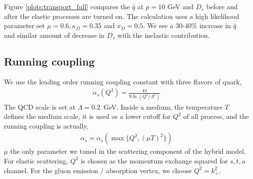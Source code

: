 \documentclass[aps, prc, reprint, amsmath, groupedaddress, nofootinbib]{revtex4-1}
\begin{document}
Figure \ref{plots:transport_full} compares the $\hat{q}$ at $p=10$ GeV and $D_s$ before and after the elastic processes are turned on.
The calculation uses a high likelihood parameter set $\mu = 0.6, \kappa_D = 0.35$ and $x_D = 0.5$. 
We see a 30-40\% increase in $\hat{q}$ and similar amount of decrease in $D_s$ with the inelastic contribution.
\begin{appendices}
\section{Running coupling}
We use the leading order running coupling constant with three flavors of quark,
\begin{eqnarray}
\alpha_s(Q^2) = \frac{4\pi}{9 \ln\left(Q^2/\Lambda^2\right) }
\end{eqnarray}
The QCD scale is set at $\Lambda = 0.2$~GeV.
Inside a medium, the temperature $T$ defines the medium scale, it is used as a lower cutoff for $Q^2$ of all process, and the running coupling is actually,
\begin{eqnarray}
\alpha_s = \alpha_s(\max\{Q^2,(\mu T)^2\})
\end{eqnarray}
$\mu$ the only parameter we tuned in the scattering component of the hybrid model.
For elastic scattering, $Q^2$ is chosen as the momentum exchange squared for $s,t,u$ channel.
For the gluon emission / absorption vertex, we choose $Q^2 = k_\perp^2$.


\end{appendices}
\end{document}
